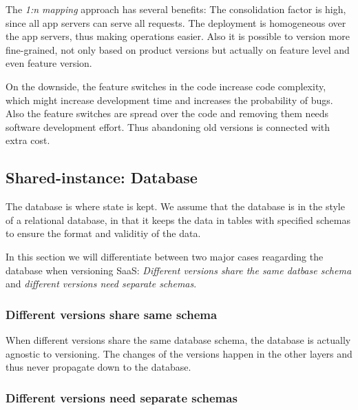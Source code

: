 The \emph{1:n mapping} approach has several benefits: The consolidation factor is high, since all app servers can serve all requests. The deployment is homogeneous over the app servers, thus making operations easier. Also it is possible to version more fine-grained, not only based on product versions but actually on feature level and even feature version.

On the downside, the feature switches in the code increase code complexity, which might increase development time and increases the probability of bugs. Also the feature switches are spread over the code and removing them needs software development effort. Thus abandoning old versions is connected with extra cost.

%
%
%

\subsection{Shared-instance: Database}
\label{sec:database}

The database is where state is kept. We assume that the database is in the style of a relational database, in that it keeps the data in tables with specified schemas to ensure the format and validitiy of the data.

In this section we will differentiate between two major cases reagarding the database when versioning SaaS: \emph{Different versions share the same datbase schema} and \emph{different versions need separate schemas}.

\subsubsection{Different versions share same schema}

When different versions share the same database schema, the database is actually agnostic to versioning. The changes of the versions happen in the other layers and thus never propagate down to the database.

\subsubsection{Different versions need separate schemas}

